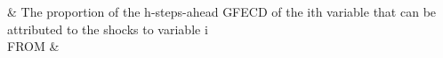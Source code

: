 \documentclass[
  number]{elsarticle}
\begin{document}
\begin{longtable}[]
                                                                                                                                                                                                                                                                                                                                                                                                                                                                                                                                                                                                                                                                                                                                                                                                                                                                                                                                                                                                                                                                                                              \)
& The proportion of the h-steps-ahead GFECD of the ith variable that can
be attributed to the shocks to variable i \\
FROM &

\end{longtable}
\end{document}
